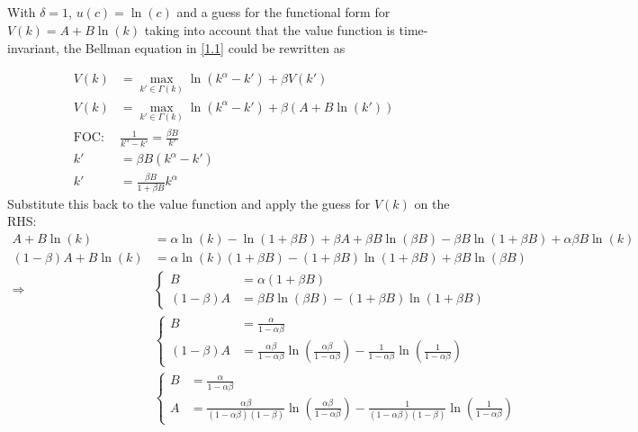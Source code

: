 \documentclass[]{article}
\begin{document}
\subsection{}\label{1.2}
With $\delta = 1$, $u(c) = \ln(c)$ and a guess for the functional form for $V(k) = A + B\ln(k)$ taking into account that the value function is time-invariant, the Bellman equation in \ref{1.1} could be rewritten as

\begin{equation}
	\begin{split}
	V(k)& = \max\limits_{k'\in\Gamma(k)}\ln(k^\alpha - k') + \beta V(k') \\ \nonumber
	V(k)& = \max\limits_{k'\in\Gamma(k)}\ln(k^\alpha - k') + \beta(A + B\ln(k')) \\
	\text{FOC: }& \frac{1}{k^\alpha - k'} = \frac{\beta B}{k'} \\
	k'& = \beta B(k^\alpha - k')\\
	k'& = \frac{\beta B}{1 + \beta B}k^\alpha
	\end{split}
\end{equation}
Substitute this back to the value function and apply the guess for $V(k)$ on the RHS:
\begin{equation}
	\begin{split}
	A + B\ln(k)& = \alpha\ln(k) - \ln(1 + \beta B) + \beta A + \beta B\ln(\beta B) - \beta B\ln(1 + \beta B) + \alpha\beta B\ln(k) \\ \nonumber
	(1-\beta)A + B\ln(k)& = \alpha\ln(k)(1 + \beta B) - (1 + \beta B)\ln(1 + \beta B) + \beta B\ln(\beta B)\\
	\Longrightarrow&\begin{cases}
	B& = \alpha(1 + \beta B)\\
	(1-\beta)A& = \beta B\ln(\beta B) - (1 + \beta B)\ln(1 + \beta B)
	\end{cases}\\
	&\begin{cases}
	B& = \frac{\alpha}{1 - \alpha\beta}\\
	(1-\beta)A& = \frac{\alpha\beta}{1 - \alpha\beta}\ln(\frac{\alpha\beta}{1 - \alpha\beta}) - \frac{1}{1 - \alpha\beta}\ln(\frac{1}{1 - \alpha\beta})
	\end{cases} \\
	&\begin{cases}
	B& = \frac{\alpha}{1 - \alpha\beta}\\
	A& = \frac{\alpha\beta}{(1 - \alpha\beta)(1 - \beta)}\ln(\frac{\alpha\beta}{1 - \alpha\beta}) - \frac{1}{(1 - \alpha\beta)(1 - \beta)}\ln(\frac{1}{1 - \alpha\beta})
	\end{cases}
	\end{split}
\end{equation}
\end{document}
